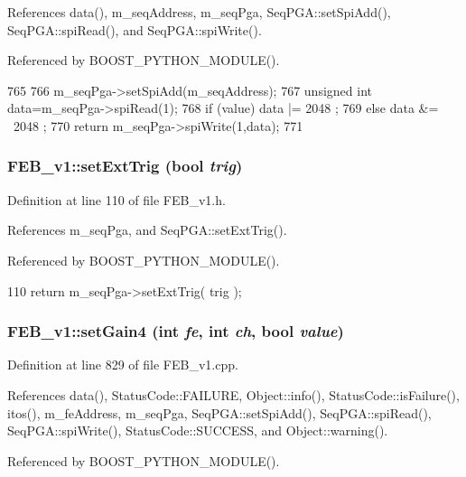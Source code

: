 References data(), m\_\-seqAddress, m\_\-seqPga, SeqPGA::setSpiAdd(), SeqPGA::spiRead(), and SeqPGA::spiWrite().

Referenced by BOOST\_\-PYTHON\_\-MODULE().


\begin{DoxyCode}
765                                                  {
766   m_seqPga->setSpiAdd(m_seqAddress);
767   unsigned int data=m_seqPga->spiRead(1);
768   if (value) data |=  2048 ;
769   else       data &= ~2048 ;
770   return m_seqPga->spiWrite(1,data);
771 }
\end{DoxyCode}
\hypertarget{classFEB__v1_aea3b1f84ea9be2e5c55a93ae215c8a35}{
\subsubsection[{setExtTrig}]{ FEB\_\-v1::setExtTrig (bool {\em trig})}}
\label{classFEB__v1_aea3b1f84ea9be2e5c55a93ae215c8a35}


Definition at line 110 of file FEB\_\-v1.h.

References m\_\-seqPga, and SeqPGA::setExtTrig().

Referenced by BOOST\_\-PYTHON\_\-MODULE().


\begin{DoxyCode}
110 { return m_seqPga->setExtTrig( trig ); }
\end{DoxyCode}
\hypertarget{classFEB__v1_ac30cac86837c86e4f03cb51fff6226cd}{
\subsubsection[{setGain4}]{ FEB\_\-v1::setGain4 (int {\em fe}, \/  int {\em ch}, \/  bool {\em value})}}
\label{classFEB__v1_ac30cac86837c86e4f03cb51fff6226cd}


Definition at line 829 of file FEB\_\-v1.cpp.

References data(), StatusCode::FAILURE, Object::info(), StatusCode::isFailure(), itos(), m\_\-feAddress, m\_\-seqPga, SeqPGA::setSpiAdd(), SeqPGA::spiRead(), SeqPGA::spiWrite(), StatusCode::SUCCESS, and Object::warning().

Referenced by BOOST\_\-PYTHON\_\-MODULE().


